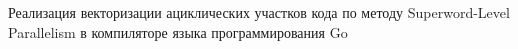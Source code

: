 Реализация векторизации ациклических участков кода по методу Superword-Level Parallelism в компиляторе языка программирования Go
